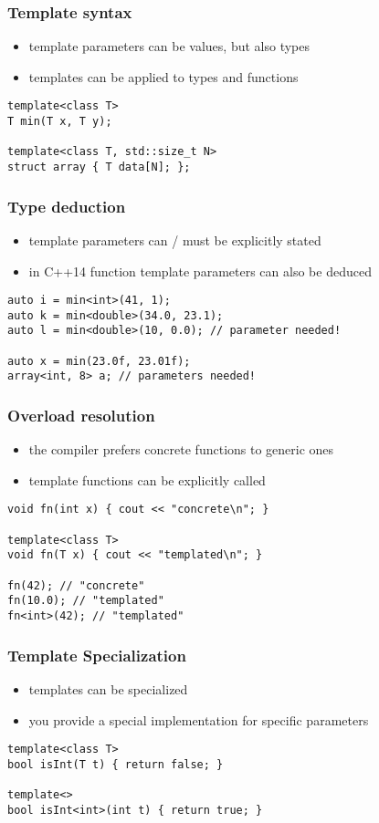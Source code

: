 \begin{frame}[fragile]
    \frametitle{Template syntax}
    \begin{itemize}
         \item template parameters can be values, but also types
         \item templates can be applied to types and functions
    \end{itemize}
    \begin{lstlisting}[numbers=none]
template<class T>
T min(T x, T y);

template<class T, std::size_t N>
struct array { T data[N]; };
    \end{lstlisting}
\end{frame}

\begin{frame}[fragile]
    \frametitle{Type deduction}
    \begin{itemize}
        \item template parameters can / must be explicitly stated
        \item in C++14 function template parameters can also be deduced
    \end{itemize}
    \begin{lstlisting}[numbers=none]
auto i = min<int>(41, 1);
auto k = min<double>(34.0, 23.1);
auto l = min<double>(10, 0.0); // parameter needed!

auto x = min(23.0f, 23.01f);
array<int, 8> a; // parameters needed!
    \end{lstlisting}
\end{frame}

\begin{frame}[fragile]
    \frametitle{Overload resolution}
    \begin{itemize}
        \item the compiler prefers concrete functions to generic ones
        \item template functions can be explicitly called
    \end{itemize}
    \begin{lstlisting}[numbers=none]
void fn(int x) { cout << "concrete\n"; }

template<class T>
void fn(T x) { cout << "templated\n"; }

fn(42); // "concrete"
fn(10.0); // "templated"
fn<int>(42); // "templated"
    \end{lstlisting}
\end{frame}

\begin{frame}[fragile]
    \frametitle{Template Specialization}
    \begin{itemize}
        \item templates can be specialized
        \item you provide a special implementation for specific parameters
    \end{itemize}
    \begin{lstlisting}[numbers=none]
template<class T>
bool isInt(T t) { return false; }

template<>
bool isInt<int>(int t) { return true; }
    \end{lstlisting}
\end{frame}

